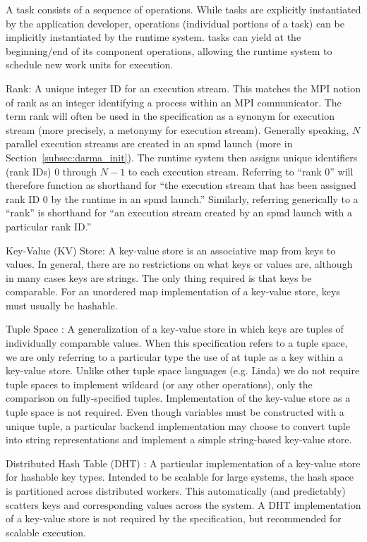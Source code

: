 \begin{compactdesc}
  A \gls{task} consists of a sequence of \glspl{operation}.
  While \glspl{task} are explicitly instantiated by the application developer,
  \glspl{operation} (individual portions of a \gls{task}) can be implicitly
  instantiated by the \gls{runtime system}.
  \Glspl{task} can yield at the beginning/end of its component
  \glspl{operation}, allowing the \gls{runtime system} to schedule new work units for execution.
\item [Rank:] A unique integer ID for an \gls{execution stream}. This matches
  the MPI notion of \gls{rank} as an integer identifying a process within an MPI communicator.
  The term \gls{rank} will often be used in the specification as a synonym for
  \gls{execution stream} (more precisely, a metonymy for \gls{execution stream}).
  Generally speaking, $N$ parallel \glspl{execution stream} are created in an
  \gls{spmd} launch (more in Section~\ref{subsec:darma_init}).
  The \gls{runtime system} then assigns unique identifiers (\gls{rank} IDs) $0$ through
  $N-1$ to each \gls{execution stream}.
  Referring to ``\gls{rank} 0'' will therefore function as shorthand for ``the
  \gls{execution stream} that has been assigned \gls{rank} ID 0 by the runtime
  in an \gls{spmd} launch.'' Similarly, referring generically to a
  ``\gls{rank}'' is shorthand for ``an \gls{execution stream} created by an
  \gls{spmd} launch with a particular \gls{rank} ID.''
\item [Key-Value (KV) Store:] A \gls{key-value store} is an associative map from
keys to values. In general, there are no restrictions on what keys or values are, although in many
cases keys are strings.  The only thing required is that keys be comparable.
For an unordered map implementation of a \gls{key-value store}, keys must usually be hashable.
\item [Tuple Space]: A generalization of a \gls{key-value store} in which keys
  are \glspl{tuple} of individually comparable values.
  When this specification refers to a \gls{tuple space}, we are only referring to a particular type
  the use of at \gls{tuple} as a key within a \gls{key-value store}.
  Unlike other \gls{tuple space} languages (e.g. \gls{Linda}) we do not require
  \glspl{tuple space} to implement wildcard (or any other operations), only the
  comparison on fully-specified \glspl{tuple}.  Implementation of the
  \gls{key-value store} as a \gls{tuple space} is not required.  
  Even though variables must be constructed with a unique \gls{tuple}, a
particular backend implementation may choose to convert
\gls{tuple} into string representations and implement a simple string-based
\gls{key-value store}.
\item [Distributed Hash Table (DHT)]: A particular implementation of a
  \gls{key-value store} for hashable key types.
Intended to be scalable for large systems, the hash space is partitioned
across distributed workers.
This automatically (and predictably) scatters keys and corresponding
values across the system.
A \gls{DHT} implementation of a \gls{key-value store} is not required by the specification,
but recommended for scalable execution.
\end{compactdesc}


